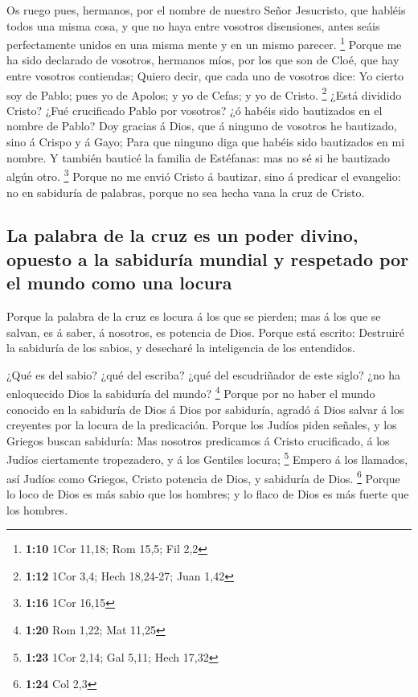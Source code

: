  Os ruego pues, hermanos, por el nombre de nuestro Señor
Jesucristo, que habléis todos una misma cosa, y que no haya entre
vosotros disensiones, antes seáis perfectamente unidos en una misma
mente y en un mismo parecer. \footnote{\textbf{1:10} 1Cor 11,18; Rom
  15,5; Fil 2,2}  Porque me ha sido declarado de
vosotros, hermanos míos, por los que son de Cloé, que hay entre vosotros
contiendas;  Quiero decir, que cada uno de vosotros dice:
Yo cierto soy de Pablo; pues yo de Apolos; y yo de Cefas; y yo de
Cristo. \footnote{\textbf{1:12} 1Cor 3,4; Hech 18,24-27; Juan 1,42}
 ¿Está dividido Cristo? ¿Fué crucificado Pablo por
vosotros? ¿ó habéis sido bautizados en el nombre de Pablo?
 Doy gracias á Dios, que á ninguno de vosotros he
bautizado, sino á Crispo y á Gayo;  Para que ninguno diga
que habéis sido bautizados en mi nombre.  Y también
bauticé la familia de Estéfanas: mas no sé si he bautizado algún otro.
\footnote{\textbf{1:16} 1Cor 16,15}  Porque no me envió
Cristo á bautizar, sino á predicar el evangelio: no en sabiduría de
palabras, porque no sea hecha vana la cruz de Cristo.

\hypertarget{la-palabra-de-la-cruz-es-un-poder-divino-opuesto-a-la-sabiduruxeda-mundial-y-respetado-por-el-mundo-como-una-locura}{%
\subsection{La palabra de la cruz es un poder divino, opuesto a la
sabiduría mundial y respetado por el mundo como una
locura}\label{la-palabra-de-la-cruz-es-un-poder-divino-opuesto-a-la-sabiduruxeda-mundial-y-respetado-por-el-mundo-como-una-locura}}

 Porque la palabra de la cruz es locura á los que se
pierden; mas á los que se salvan, es á saber, á nosotros, es potencia de
Dios.  Porque está escrito: Destruiré la sabiduría de los
sabios, y desecharé la inteligencia de los entendidos.

 ¿Qué es del sabio? ¿qué del escriba? ¿qué del
escudriñador de este siglo? ¿no ha enloquecido Dios la sabiduría del
mundo? \footnote{\textbf{1:20} Rom 1,22; Mat 11,25} 
Porque por no haber el mundo conocido en la sabiduría de Dios á Dios por
sabiduría, agradó á Dios salvar á los creyentes por la locura de la
predicación.  Porque los Judíos piden señales, y los
Griegos buscan sabiduría:  Mas nosotros predicamos á
Cristo crucificado, á los Judíos ciertamente tropezadero, y á los
Gentiles locura; \footnote{\textbf{1:23} 1Cor 2,14; Gal 5,11; Hech 17,32}
 Empero á los llamados, así Judíos como Griegos, Cristo
potencia de Dios, y sabiduría de Dios. \footnote{\textbf{1:24} Col 2,3}
 Porque lo loco de Dios es más sabio que los hombres; y
lo flaco de Dios es más fuerte que los hombres.


